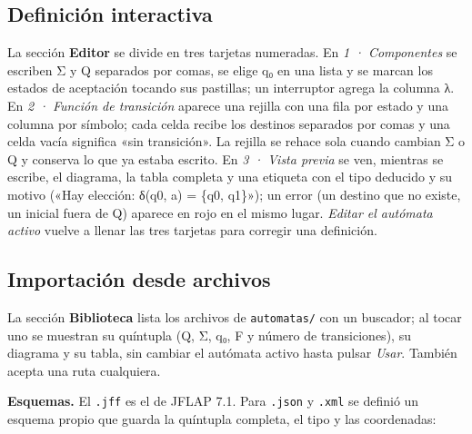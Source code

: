 \hypertarget{definiciuxf3n-interactiva}{%
\subsection{Definición interactiva}\label{definiciuxf3n-interactiva}}

La sección \textbf{Editor} se divide en tres tarjetas numeradas. En \emph{1 · Componentes} se escriben Σ y Q separados por comas, se elige q₀ en una lista y se marcan los estados de aceptación tocando sus pastillas; un interruptor agrega la columna λ. En \emph{2 · Función de transición} aparece una rejilla con una fila por estado y una columna por símbolo; cada celda recibe los destinos separados por comas y una celda vacía significa «sin transición». La rejilla se rehace sola cuando cambian Σ o Q y conserva lo que ya estaba escrito. En \emph{3 · Vista previa} se ven, mientras se escribe, el diagrama, la tabla completa y una etiqueta con el tipo deducido y su motivo («Hay elección: δ(q0, a) = \{q0, q1\}»); un error (un destino que no existe, un inicial fuera de Q) aparece en rojo en el mismo lugar. \emph{Editar el autómata activo} vuelve a llenar las tres tarjetas para corregir una definición.


\hypertarget{importaciuxf3n-desde-archivos}{%
\subsection{Importación desde archivos}\label{importaciuxf3n-desde-archivos}}

La sección \textbf{Biblioteca} lista los archivos de \texttt{automatas/} con un buscador; al tocar uno se muestran su quíntupla (Q, Σ, q₀, F y número de transiciones), su diagrama y su tabla, sin cambiar el autómata activo hasta pulsar \emph{Usar}. También acepta una ruta cualquiera.

\textbf{Esquemas.} El \texttt{.jff} es el de JFLAP 7.1. Para \texttt{.json} y \texttt{.xml} se definió un esquema propio que guarda la quíntupla completa, el tipo y las coordenadas:

